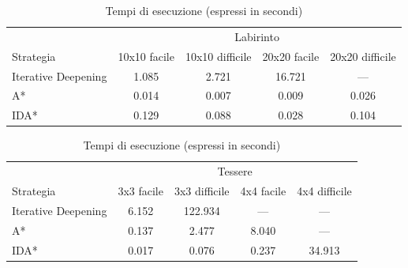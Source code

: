 \documentclass[a4paper,oneside,12pt]{book}
\begin{document}
    \begin{table}
        \centering
        \begin{tabular}{l c c c c}
            \toprule %
            & \multicolumn{4}{c}{Labirinto} \\ %
            \cmidrule(l){2-5} %
            Strategia & 10x10 facile & 10x10 difficile & 20x20 facile & 20x20 difficile\\ %
            \midrule %
            Iterative Deepening & 1.085 & 2.721 & 16.721 & --- \\ %
            A* & 0.014 & 0.007 & 0.009 & 0.026\\ %
            IDA* & 0.129 & 0.088 & 0.028 & 0.104 \\ %

            \bottomrule
        \end{tabular}
        \caption{Tempi di esecuzione (espressi in secondi)}
    \end{table}
    \begin{table}
        \centering
        \begin{tabular}{l c c c c}
            \toprule %
            & \multicolumn{4}{c}{Tessere} \\ %
            \cmidrule(l){2-5} %
            Strategia & 3x3 facile & 3x3 difficile & 4x4 facile & 4x4 difficile\\ %
            \midrule %
            Iterative Deepening
            & 6.152	 & 122.934 & --- & --- \\ %
            A*
            & 0.137 & 2.477 & 8.040 & ---\\ %
            IDA*
            & 0.017 & 0.076 & 0.237 & 34.913 \\ %

            \bottomrule
        \end{tabular}
        \caption{Tempi di esecuzione (espressi in secondi)}
    \end{table}
\end{document}
